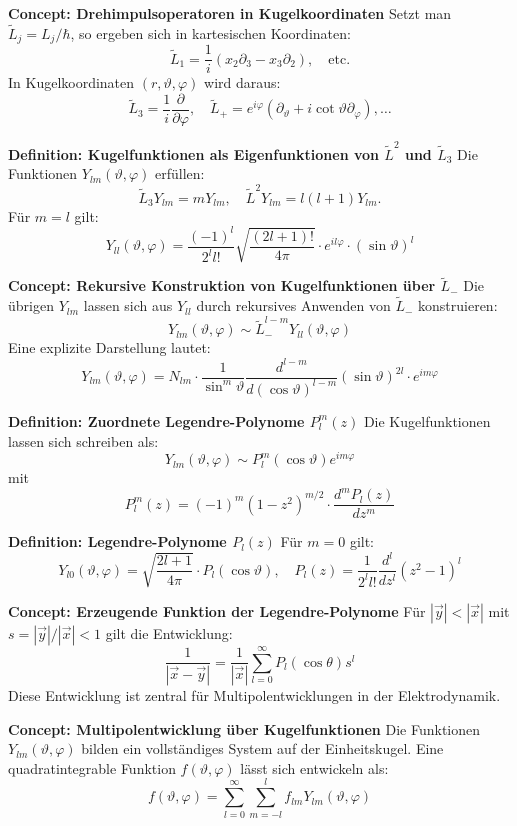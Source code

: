 \documentclass[10pt, letterpaper]{article}
\begin{document}
\textbf{Concept: Drehimpulsoperatoren in Kugelkoordinaten}  
Setzt man \(\tilde{L}_j = L_j / \hbar\), so ergeben sich in kartesischen Koordinaten:
$$
\tilde{L}_1 = \frac{1}{i}(x_2 \partial_3 - x_3 \partial_2), \quad \text{etc.}
$$
In Kugelkoordinaten \((r, \vartheta, \varphi)\) wird daraus:
$$
\tilde{L}_3 = \frac{1}{i} \frac{\partial}{\partial \varphi}, \quad
\tilde{L}_+ = e^{i \varphi} \left( \partial_\vartheta + i \cot \vartheta \partial_\varphi \right), \dots
$$


\textbf{Definition: Kugelfunktionen als Eigenfunktionen von \(\tilde{L}^2\) und \(\tilde{L}_3\)}  
Die Funktionen \(Y_{lm}(\vartheta, \varphi)\) erfüllen:
$$
\tilde{L}_3 Y_{lm} = m Y_{lm}, \quad \tilde{L}^2 Y_{lm} = l(l+1) Y_{lm}.
$$
Für \(m = l\) gilt:
$$
Y_{ll}(\vartheta, \varphi) = \frac{(-1)^l}{2^l l!} \sqrt{\frac{(2l+1)!}{4\pi}} \cdot e^{i l \varphi} \cdot (\sin \vartheta)^l
$$



\textbf{Concept: Rekursive Konstruktion von Kugelfunktionen über \(\tilde{L}_-\)}  
Die übrigen \(Y_{lm}\) lassen sich aus \(Y_{ll}\) durch rekursives Anwenden von \(\tilde{L}_-\) konstruieren:
$$
Y_{lm}(\vartheta, \varphi) \sim \tilde{L}_-^{l-m} Y_{ll}(\vartheta, \varphi)
$$
Eine explizite Darstellung lautet:
$$
Y_{lm}(\vartheta, \varphi) = N_{lm} \cdot \frac{1}{\sin^m \vartheta} \frac{d^{l - m}}{d (\cos \vartheta)^{l - m}} (\sin \vartheta)^{2l} \cdot e^{i m \varphi}
$$


\textbf{Definition: Zuordnete Legendre-Polynome \(P_l^m(z)\)}  
Die Kugelfunktionen lassen sich schreiben als:
$$
Y_{lm}(\vartheta, \varphi) \sim P_l^m(\cos \vartheta) e^{i m \varphi}
$$
mit
$$
P_l^m(z) = (-1)^m (1 - z^2)^{m/2} \cdot \frac{d^m P_l(z)}{dz^m}
$$


\textbf{Definition: Legendre-Polynome \(P_l(z)\)}  
Für \(m = 0\) gilt:
$$
Y_{l0}(\vartheta, \varphi) = \sqrt{\frac{2l+1}{4\pi}} \cdot P_l(\cos \vartheta), \quad
P_l(z) = \frac{1}{2^l l!} \frac{d^l}{dz^l}(z^2 - 1)^l
$$



\textbf{Concept: Erzeugende Funktion der Legendre-Polynome}  
Für \(|\vec{y}| < |\vec{x}|\) mit \(s = |\vec{y}| / |\vec{x}| < 1\) gilt die Entwicklung:
$$
\frac{1}{|\vec{x} - \vec{y}|} = \frac{1}{|\vec{x}|} \sum_{l=0}^{\infty} P_l(\cos \theta) s^l
$$
Diese Entwicklung ist zentral für Multipolentwicklungen in der Elektrodynamik.


\textbf{Concept: Multipolentwicklung über Kugelfunktionen}  
Die Funktionen \(Y_{lm}(\vartheta, \varphi)\) bilden ein vollständiges System auf der Einheitskugel. Eine quadratintegrable Funktion \(f(\vartheta, \varphi)\) lässt sich entwickeln als:
$$
f(\vartheta, \varphi) = \sum_{l=0}^{\infty} \sum_{m=-l}^{l} f_{lm} Y_{lm}(\vartheta, \varphi)
$$
\end{document}
